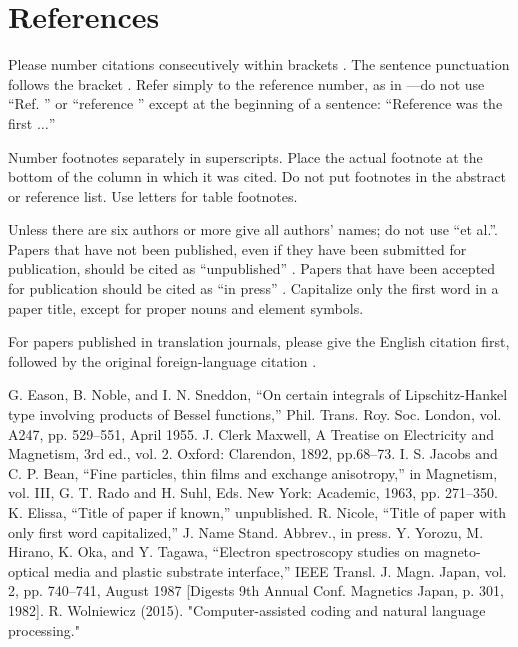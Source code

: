 \documentclass[conference]{IEEEtran}
\begin{document}
\section*{References}

Please number citations consecutively within brackets \cite{b1}. The 
sentence punctuation follows the bracket \cite{b2}. Refer simply to the reference 
number, as in \cite{b3}---do not use ``Ref. \cite{b3}'' or ``reference \cite{b3}'' except at 
the beginning of a sentence: ``Reference \cite{b3} was the first $\ldots$''

Number footnotes separately in superscripts. Place the actual footnote at 
the bottom of the column in which it was cited. Do not put footnotes in the 
abstract or reference list. Use letters for table footnotes.

Unless there are six authors or more give all authors' names; do not use 
``et al.''. Papers that have not been published, even if they have been 
submitted for publication, should be cited as ``unpublished'' \cite{b4}. Papers 
that have been accepted for publication should be cited as ``in press'' \cite{b5}. 
Capitalize only the first word in a paper title, except for proper nouns and 
element symbols.

For papers published in translation journals, please give the English 
citation first, followed by the original foreign-language citation \cite{b6}.

\begin{thebibliography}{00}
 G. Eason, B. Noble, and I. N. Sneddon, ``On certain integrals of Lipschitz-Hankel type involving products of Bessel functions,'' Phil. Trans. Roy. Soc. London, vol. A247, pp. 529--551, April 1955.
 J. Clerk Maxwell, A Treatise on Electricity and Magnetism, 3rd ed., vol. 2. Oxford: Clarendon, 1892, pp.68--73.
 I. S. Jacobs and C. P. Bean, ``Fine particles, thin films and exchange anisotropy,'' in Magnetism, vol. III, G. T. Rado and H. Suhl, Eds. New York: Academic, 1963, pp. 271--350.
 K. Elissa, ``Title of paper if known,'' unpublished.
 R. Nicole, ``Title of paper with only first word capitalized,'' J. Name Stand. Abbrev., in press.
 Y. Yorozu, M. Hirano, K. Oka, and Y. Tagawa, ``Electron spectroscopy studies on magneto-optical media and plastic substrate interface,'' IEEE Transl. J. Magn. Japan, vol. 2, pp. 740--741, August 1987 [Digests 9th Annual Conf. Magnetics Japan, p. 301, 1982].
 R. Wolniewicz (2015). "Computer-assisted coding and natural language processing."
\end{thebibliography}
\end{document}
